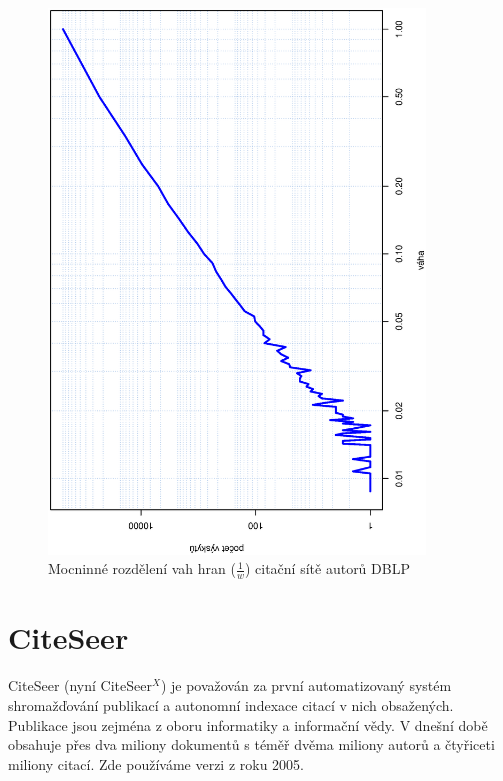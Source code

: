 \documentclass{bakalarka}
\begin{document}
\begin{figure}[!ht]
\centering
	\includegraphics[width=10cm,angle=270]{ewd_dblp.eps}
	\caption{Mocninné rozdělení vah hran ($\frac{1}{w}$) citační sítě autorů DBLP}
\end{figure}


\section{CiteSeer}
CiteSeer (nyní CiteSeer$^X$) \cite{citeseer} je považován za první
automatizovaný systém shromažďování publikací a autonomní indexace citací v
nich obsažených. Publikace jsou zejména z oboru informatiky a informační vědy.
V dnešní době obsahuje přes dva miliony dokumentů s téměř dvěma miliony autorů
a čtyřiceti miliony citací. Zde používáme verzi z roku 2005.
\end{document}
